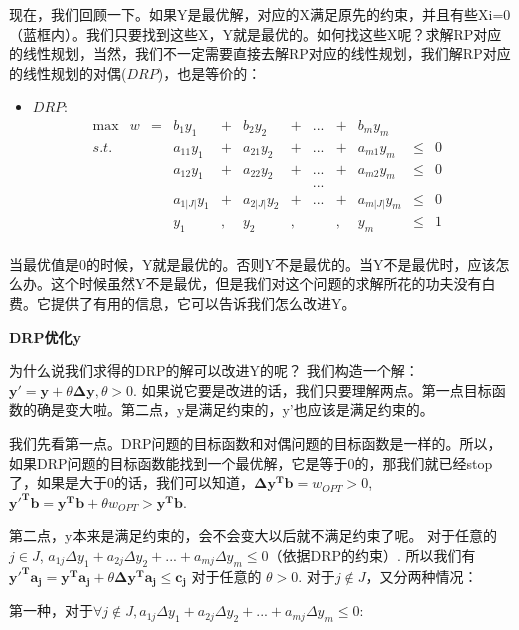 现在，我们回顾一下。如果Y是最优解，对应的X满足原先的约束，并且有些Xi=0（蓝框内）。我们只要找到这些X，Y就是最优的。如何找这些X呢？求解RP对应的线性规划，当然，我们不一定需要直接去解RP对应的线性规划，我们解RP对应的线性规划的对偶($DRP$)，也是等价的：
\begin{itemize}
\item $DRP$:
\[
\begin{array}{rrrrrrrrrrrrrrrrrrrrl}
\max & w &=& b_1y_1    &+&  b_2y_2   &+&  ...&+& b_my_m    &      &    & \\
 s.t. & & & a_{11}y_1 &+& a_{21}y_2 &+& ... &+& a_{m1}y_m & \leq & 0 &  \\
      & & & a_{12}y_1 &+& a_{22}y_2 &+& ... &+& a_{m2}y_m & \leq & 0 &  \\
      & & &          & &           & & ... & &           &      &     &  \\
      & & & a_{1|J|}y_1 &+& a_{2|J|}y_2 &+& ... &+& a_{m|J|}y_m & \leq & 0 & \\
      & & &      y_1 &,&       y_2 &,&     &,&       y_m & \leq & 1   & \\
     \end{array} \nonumber
\]
\end{itemize}
当最优值是0的时候，Y就是最优的。否则Y不是最优的。当Y不是最优时，应该怎么办。这个时候虽然Y不是最优，但是我们对这个问题的求解所花的功夫没有白费。它提供了有用的信息，它可以告诉我们怎么改进Y。


\textbf{DRP优化y}

为什么说我们求得的DRP的解可以改进Y的呢？
我们构造一个解：$\mathbf{y' = y +} \theta \mathbf{ \Delta y}, \theta > 0 $.
如果说它要是改进的话，我们只要理解两点。第一点目标函数的确是变大啦。第二点，y是满足约束的，y'也应该是满足约束的。

我们先看第一点。DRP问题的目标函数和对偶问题的目标函数是一样的。所以，如果DRP问题的目标函数能找到一个最优解，它是等于0的，那我们就已经stop了，如果是大于0的话，我们可以知道，$\mathbf{\Delta y^T b } = w_{OPT}  > 0$,  $\mathbf{y'^T b = y^T b } + \theta w_{OPT}  > \mathbf{ y^T b}$.

第二点，y本来是满足约束的，会不会变大以后就不满足约束了呢。
对于任意的$ j \in J$,  $a_{1j} \Delta y_1 + a_{2j}\Delta y_2 + ... + a_{mj}\Delta y_m  \leq  0$（依据DRP的约束）. 所以我们有 $\mathbf{y'^Ta_j} = \mathbf{y^Ta_j} + \theta \mathbf{\Delta y^Ta_j} \leq \mathbf{c_j}$ 对于任意的 $\theta > 0$.
对于$j \notin J$，又分两种情况：

第一种，对于$\forall j \notin J, a_{1j} \Delta y_1 + a_{2j}\Delta y_2 + ... + a_{mj}\Delta y_m  \leq  0$:

